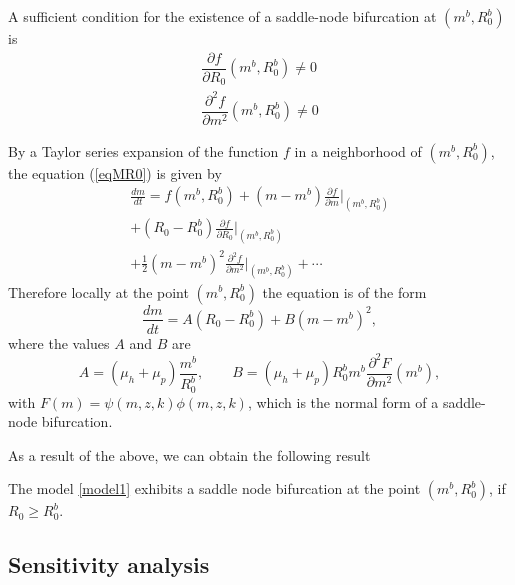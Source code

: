 \documentclass[eng]{MMSB-class-eng}
\begin{document}
{A sufficient condition for the existence of a saddle-node bifurcation at $(m^b,R_0^b)$ is
\begin{equation}
\begin{split}
\dfrac{\partial f }{\partial R_0}(m^b,R_0^b)\neq0\\
\dfrac{\partial^2 f }{\partial m^2}(m^b,R_0^b)\neq0
\end{split}
\end{equation}

By a Taylor series expansion of the function $f$ in a neighborhood of $(m^b,R_0^b)$, the equation (\ref{eqMR0}) is given by
\begin{multline}
	\frac{dm}{dt}=f(m^b,R_0^b)+(m-m^b)\frac{\partial f }{\partial m}\big\vert_{(m^b,R_0^b)}\\ 
	+(R_0-R_0^b){\frac{\partial f }{\partial R_0}\big\vert_{(m^b,R_0^b)}}\\%
+{\frac {1}{2}}(m-m^b)^2{\frac{\partial^2 f }{\partial m^2}}\big\vert_{(m^b,R_0^b)}%
	+\cdots 
\end{multline}
Therefore locally at the point $(m^b,R_0^b)$ the equation is of the form
\begin{equation}
\dfrac{dm}{dt}=A(R_0- R_0^b)+B(m- m^b)^2,
\end{equation}
where the values $A$ and $B$ are
\begin{equation}
A=(\mu_h +\mu_p)\frac{ m^b}{ R_0^b}, \qquad  B=(\mu_h + \mu_p) R_0^b  m^b \frac{\partial^2 F}{\partial m^2}( m^b),
\end{equation}
with $F(m)= \psi(m,z,k)\phi(m,z, k)$,
which is the normal form of a saddle-node bifurcation.

{\color{red}
As a result of the above, we can obtain the following result
\begin{theorem}
	The model \eqref{model1} exhibits a saddle node bifurcation at the point $(m^b,R_0^b)$, if $R_0 \geq R_0^b$.
\end{theorem}
}

}


\subsection{Sensitivity analysis}
	
\end{document}
